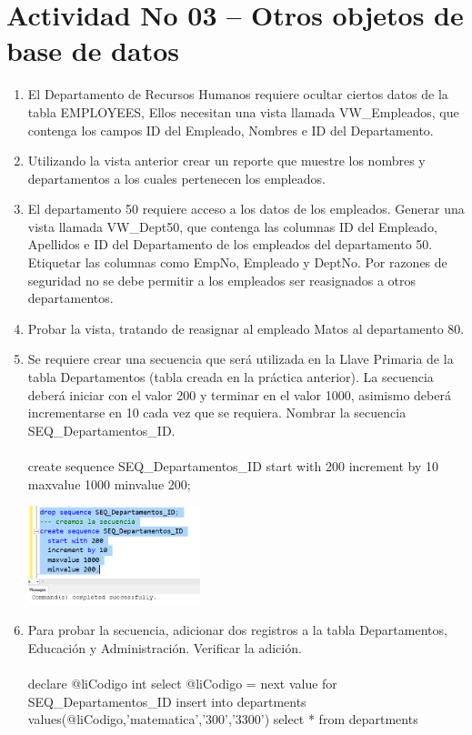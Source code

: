 \section{Actividad No 03 –  Otros objetos de base de datos} 
		
\begin{enumerate}[1.]
	\item El Departamento de Recursos Humanos requiere ocultar ciertos datos de la tabla EMPLOYEES, Ellos necesitan una vista llamada VW\_Empleados, que contenga los campos ID del Empleado, Nombres e ID del Departamento.
	\item Utilizando la vista anterior crear un reporte que muestre los nombres y departamentos a los cuales
pertenecen los empleados.
	\item El departamento 50 requiere acceso a los datos de los empleados. Generar una vista llamada VW\_Dept50, que contenga las columnas ID del Empleado, Apellidos e ID del Departamento de los empleados del departamento 50. Etiquetar las columnas como EmpNo, Empleado y DeptNo. Por razones de seguridad no se debe permitir a los empleados ser reasignados a otros departamentos.
	\item Probar la vista, tratando de reasignar al empleado Matos al departamento 80.

	

	\item Se requiere crear una secuencia que será utilizada en la Llave Primaria de la tabla Departamentos (tabla creada en la práctica anterior). La secuencia deberá iniciar con el valor 200 y terminar en el valor 1000, asimismo deberá incrementarse en 10 cada vez que se requiera. Nombrar la secuencia SEQ\_Departamentos\_ID.
	\\ \\ create sequence SEQ\_Departamentos\_ID start with 200 increment by 10 maxvalue 1000 minvalue 200;	
	
	\begin{center}
	\includegraphics[width=5cm]{./Imagenes/actividad_03_05} 
	\end{center}

	\item Para probar la secuencia, adicionar dos registros a la tabla Departamentos, Educación y Administración. Verificar la adición.
	\\ \\ declare @liCodigo int select @liCodigo = next value for SEQ\_Departamentos\_ID insert into departments  values(@liCodigo,'matematica','300','3300') select * from departments


\end{enumerate}
